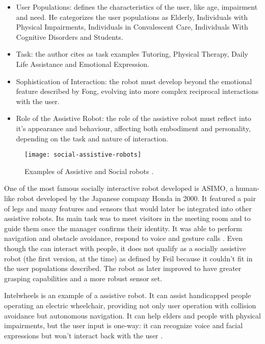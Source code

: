 \begin{itemize}
    \item User Populations: defines the characteristics of the user, like age, impairment and need. He categorizes the user populations as Elderly, Individuals with Physical Impairments, Individuals in Convalescent Care, Individuals With Cognitive Disorders and Students.
    \item Task: the author cites as task examples Tutoring, Physical Therapy, Daily Life Assistance and Emotional Expression. 
    \item Sophistication of Interaction: the robot must develop beyond the emotional feature described by Fong, evolving into more complex reciprocal interactions with the user.
    \item Role of the Assistive Robot: the role of the assistive robot must reflect into it's appearance and behaviour, affecting both embodiment and personality, depending on the task and nature of interaction.
\end{itemize}

\begin{figure}[!ht]
    \centering
    \texttt{[image: social-assistive-robots]}
    \caption{Examples of Assistive and Social robots \cite{sakagami2002intelligent,braga2008intellwheels,tanaka2015pepper}.}
    \label{fig:social-assistive-robots}
\end{figure}

One of the most famous socially interactive robot developed is ASIMO, a human-like robot developed by the Japanese company Honda in 2000. It featured a pair of legs and many features and sensors that would later be integrated into other assistive robots. Its main task was to meet visitors in the meeting room and to guide them once the manager confirms their identity. It was able to perform navigation and obstacle avoidance, respond to voice and gesture calls \cite{sakagami2002intelligent}. Even though the can interact with people, it does not qualify as a socially assistive robot (the first version, at the time) as defined by Feil because it couldn't fit in the user populations described. The robot as later improved to have greater grasping capabilities and a more robust sensor set.

Intelwheels is an example of a assistive robot. It can assist handicapped people operating an electric wheelchair, providing not only user operation with collision avoidance but autonomous navigation. It can help elders and people with physical impairments, but the user input is one-way: it can recognize voice and facial expressions but won't interact back with the user \cite{braga2008intellwheels}.

